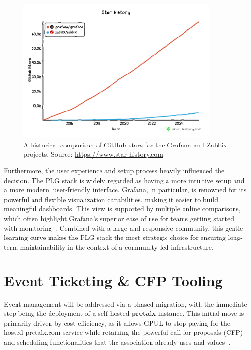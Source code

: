 \begin{figure}[H]
  \centering
  \includegraphics[width=0.9\textwidth]{imaxes/monitoring-stars.png}
  \caption{A historical comparison of GitHub stars for the Grafana and Zabbix projects. Source: \url{https://www.star-history.com}}
  \label{fig:monitoring-stars}
\end{figure}

Furthermore, the user experience and setup process heavily influenced the decision. The PLG stack is widely regarded as having a more intuitive setup and a more modern, user-friendly interface. Grafana, in particular, is renowned for its powerful and flexible visualization capabilities, making it easier to build meaningful dashboards. This view is supported by multiple online comparisons, which often highlight Grafana's superior ease of use for teams getting started with monitoring~\cite{squadcast-zabbix-grafana}. Combined with a large and responsive community, this gentle learning curve makes the PLG stack the most strategic choice for ensuring long-term maintainability in the context of a community-led infrastructure.

\section{Event Ticketing \& CFP Tooling}

Event management will be addressed via a phased migration, with the immediate step being the deployment of a self-hosted \textbf{pretalx} instance. This initial move is primarily driven by cost-efficiency, as it allows GPUL to stop paying for the hosted pretalx.com service while retaining the powerful call-for-proposals (CFP) and scheduling functionalities that the association already uses and values~\cite{pretalx-docs}.

